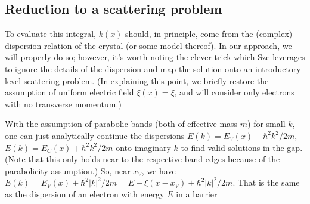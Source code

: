 \subsection{Reduction to a scattering problem}
To evaluate this integral, $k(x)$ should, in principle, come from the (complex) dispersion relation of the crystal (or some model thereof).  In our approach, we will properly do so; however, it's worth noting the clever trick which Sze leverages to ignore the details of the dispersion and map the solution onto an introductory-level scattering problem.  (In explaining this point, we briefly restore the assumption of uniform electric field $\xi(x)=\xi$, and will consider only electrons with no transverse momentum.)

With the assumption of parabolic bands (both of effective mass $m$) for small $k$, one can just analytically continue the dispersions $E(k)=E_V(x)-\hbar^2k^2/2m$, $E(k)=E_C(x)+\hbar^2k^2/2m$ onto imaginary $k$ to find valid solutions in the gap.  (Note that this only holds near to the respective band edges because of the parabolicity assumption.)  So, near $x_V$, we have $E(k)=E_V(x)+\hbar^2|k|^2/2m=E-\xi(x-x_V)+\hbar^2|k|^2/2m$.  That is the same as the dispersion of an electron with energy $E$ in a barrier